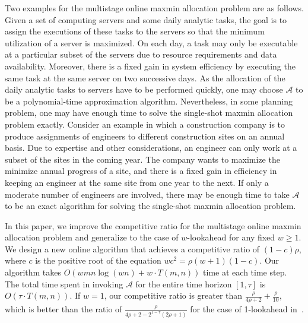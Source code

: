 \documentclass[11pt,a4paper]{article}
\renewcommand{\geq}{\geqslant}
\begin{document}
Two examples for the multistage online maxmin allocation problem are as follows.   Given a set of computing servers and some daily analytic tasks, the goal is to assign the executions of these tasks to the servers so that the minimum utilization of a server is maximized.  On each day, a task may only be executable at a particular subset of the servers due to resource requirements and data availability.  Moreover, there is a fixed gain in system efficiency by executing the same task at the same server on two successive days.  As the allocation of the daily analytic tasks to servers have to be performed quickly, one may choose $\mathcal{A}$ to be a polynomial-time approximation algorithm.  Nevertheless, in some planning problem, one may have enough time to solve the single-shot maxmin allocation problem exactly.  Consider an example in which a construction company is to produce assignments of engineers to different construction sites on an annual basis. Due to expertise and other considerations, an engineer can only work at a subset of the sites in the coming year.  The company wants to maximize the minimize annual progress of a site, and there is a fixed gain in efficiency in keeping an engineer at the same site from one year to the next.  If only a moderate number of engineers are involved, there may be enough time to take $\mathcal{A}$ to be an exact algorithm for solving the single-shot maxmin allocation problem.

In this paper, we improve the competitive ratio for the multistage online maxmin allocation problem and generalize to the case of $w$-lookahead for any fixed $w \geq1$.  We design a new online algorithm that achieves a competitive ratio of $(1-c)\rho$, where $c$ is the positive root of the equation $wc^2 = \rho(w+1)(1-c)$.  Our algorithm takes $O(wmn\log (wn) + w\cdot T(m,n))$ time at each time step.  The total time spent in invoking $\mathcal{A}$ for the entire time horizon $[1,\tau]$ is $O(\tau \cdot T(m,n))$.  If $w = 1$, our competitive ratio is greater than $\frac{\rho}{4\rho+2} + \frac{\rho}{10}$, which is better than the ratio of $\frac{\rho}{4\rho+2 - 2^{1-\tau}(2\rho+1)}$ for the case of 1-lookahead in~\cite{BEM18}.  



	
\end{document}
